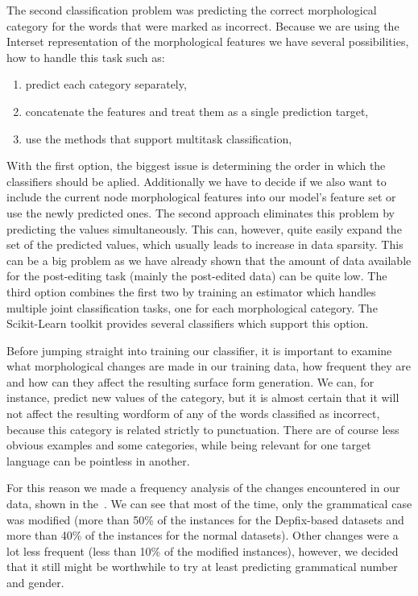 The second classification problem was predicting the correct morphological category for
the words that were marked as incorrect. Because we are using the Interset representation
of the morphological features we have several possibilities, how to handle this task such
as:
\begin{enumerate}
    \item predict each category separately,
    \item concatenate the features and treat them as a single prediction target,
    \item use the methods that support multitask classification,
\end{enumerate}

With the first option, the biggest issue is determining the order in which the classifiers
should be aplied. Additionally we have to decide if we also want to include the current node morphological features
into our model's feature set or use the newly predicted ones. The second approach eliminates this problem by predicting the
values simultaneously. This can, however, quite easily expand the set of the predicted values,
which usually leads to increase in data sparsity. This can be a big problem as we have
already shown that the amount of data available for the post-editing task (mainly the post-edited
data) can be quite low. The third option combines the first two by training an estimator
which handles multiple joint classification tasks, one for each morphological category. The
Scikit-Learn toolkit provides several classifiers which support this option.

Before jumping straight into training our classifier, it is important to examine what morphological
changes are made in our training data, how frequent they are and how can they affect the resulting
surface form generation. We can, for instance, predict new values of the  category,
but it is almost certain that it will not affect the resulting wordform of any of the words
classified as incorrect, because this category is related strictly to punctuation. There are
of course less obvious examples and some categories, while being relevant for one target language
can be pointless in another.

For this reason we made a frequency analysis of the changes encountered
in our data, shown in the~. We can see that most of the time, only the grammatical
case was modified (more than 50\% of the instances for the Depfix-based datasets and more than 40\% of the instances for
the normal datasets). Other changes were a lot less frequent (less than 10\% of the modified instances), however,
we decided that it still might be worthwhile to try at least predicting grammatical number and gender.

